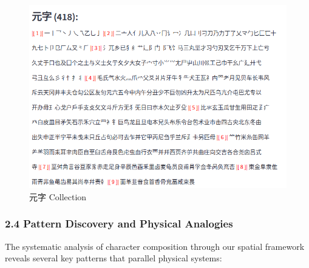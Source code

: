 \documentclass[
  11pt,
  letterpaper,
]{article}
\begin{document}
\begin{figure}
\centering
\includegraphics{./images/app_zi-elements.png}
\caption{元字 Collection}
\end{figure}

\hypertarget{pattern-discovery-and-physical-analogies}{%
\subsubsection{2.4 Pattern Discovery and Physical
Analogies}\label{pattern-discovery-and-physical-analogies}}

The systematic analysis of character composition through our spatial
framework reveals several key patterns that parallel physical systems:
\end{document}
